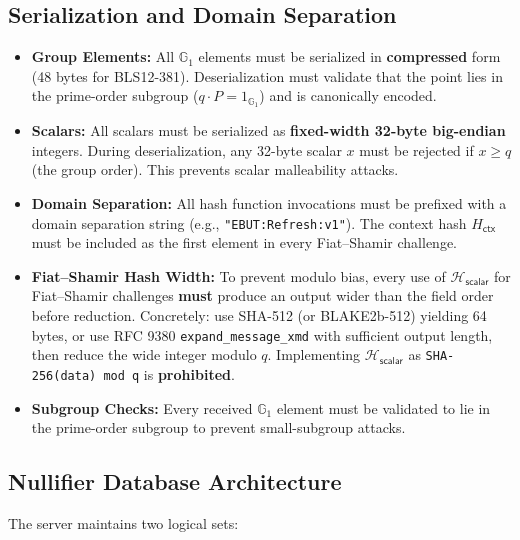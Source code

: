 \documentclass[11pt]{article}
\theoremstyle{definitionstyle}
\theoremstyle{plain}
\begin{document}
\subsection{Serialization and Domain Separation}

\begin{itemize}[leftmargin=*]
\item \textbf{Group Elements:} All $\mathbb{G}_1$ elements must be serialized in \textbf{compressed} form (48 bytes for BLS12-381). Deserialization must validate that the point lies in the prime-order subgroup ($q \cdot P = 1_{\mathbb{G}_1}$) and is canonically encoded.
\item \textbf{Scalars:} All scalars must be serialized as \textbf{fixed-width 32-byte big-endian} integers. During deserialization, any 32-byte scalar $x$ must be rejected if $x \ge q$ (the group order). This prevents scalar malleability attacks.
\item \textbf{Domain Separation:} All hash function invocations must be prefixed with a domain separation string (e.g., \texttt{"EBUT:Refresh:v1"}). The context hash $H_{\mathsf{ctx}}$ must be included as the first element in every Fiat--Shamir challenge.
\item \textbf{Fiat--Shamir Hash Width:} To prevent modulo bias, every use of $\mathcal{H}_{\mathsf{scalar}}$ for Fiat--Shamir challenges \textbf{must} produce an output wider than the field order before reduction. Concretely: use SHA-512 (or BLAKE2b-512) yielding 64 bytes, or use RFC 9380 \texttt{expand\_message\_xmd} with sufficient output length, then reduce the wide integer modulo $q$. Implementing $\mathcal{H}_{\mathsf{scalar}}$ as \texttt{SHA-256(data) mod q} is \textbf{prohibited}.
\item \textbf{Subgroup Checks:} Every received $\mathbb{G}_1$ element must be validated to lie in the prime-order subgroup to prevent small-subgroup attacks.
\end{itemize}

\subsection{Nullifier Database Architecture}

The server maintains two logical sets:
\end{document}
